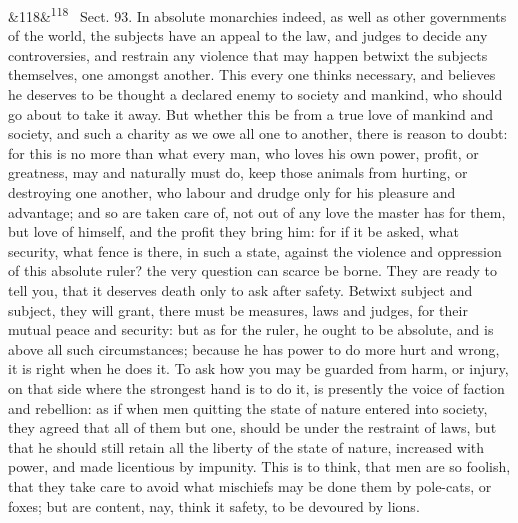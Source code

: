 \documentclass[12pt]{article}
\newcommand{\para}[1][]{\par\noindent\ifx&#1&\else\textsuperscript{\footnotesize #1}~\fi}
\begin{document}
\para[118] Sect. 93. In absolute monarchies indeed, as well as other governments of the world, the subjects have an appeal to the law, and judges to decide any controversies, and restrain any violence that may happen betwixt the subjects themselves, one amongst another. This every one thinks necessary, and believes he deserves to be thought a declared enemy to society and mankind, who should go about to take it away. But whether this be from a true love of mankind and society, and such a charity as we owe all one to another, there is reason to doubt: for this is no more than what every man, who loves his own power, profit, or greatness, may and naturally must do, keep those animals from hurting, or destroying one another, who labour and drudge only for his pleasure and advantage; and so are taken care of, not out of any love the master has for them, but love of himself, and the profit they bring him: for if it be asked, what security, what fence is there, in such a state, against the violence and oppression of this absolute ruler? the very question can scarce be borne. They are ready to tell you, that it deserves death only to ask after safety. Betwixt subject and subject, they will grant, there must be measures, laws and judges, for their mutual peace and security: but as for the ruler, he ought to be absolute, and is above all such circumstances; because he has power to do more hurt and wrong, it is right when he does it. To ask how you may be guarded from harm, or injury, on that side where the strongest hand is to do it, is presently the voice of faction and rebellion: as if when men quitting the state of nature entered into society, they agreed that all of them but one, should be under the restraint of laws, but that he should still retain all the liberty of the state of nature, increased with power, and made licentious by impunity. This is to think, that men are so foolish, that they take care to avoid what mischiefs may be done them by pole-cats, or foxes; but are content, nay, think it safety, to be devoured by lions.
\end{document}
